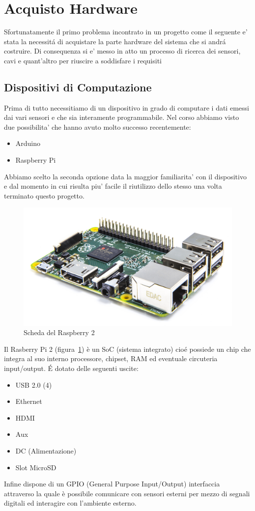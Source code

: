 \section{Acquisto Hardware}

Sfortunatamente il primo problema incontrato in un progetto come il seguente e' stata la necessit\'a di acquistare la parte hardware del sistema che si andr\' a costruire. Di consequenza si e' messo in atto un processo di ricerca dei sensori, cavi e quant'altro per riuscire a soddisfare i requisiti

\subsection{Dispositivi di Computazione}

Prima di tutto necessitiamo di un dispositivo in grado di computare i dati emessi dai vari sensori e che sia interamente programmabile. Nel corso abbiamo visto due possibilita' che hanno avuto molto successo recentemente:

\begin{itemize}
  \item Arduino
  \item Raspberry Pi
\end{itemize}

Abbiamo scelto la seconda opzione data la maggior familiarita' con il dispositivo e dal momento in cui risulta piu' facile il riutilizzo dello stesso una volta terminato questo progetto.

\begin{figure}
\centering
\includegraphics[width=0.7\linewidth]{Figures/Sensors&Rasp/Pi2}
\caption[raspberry]{Scheda del Raspberry 2}
\label{fig:Pi2}
\end{figure}



Il Rasberry Pi 2 (figura~\ref{fig:Pi2}) è un SoC (sistema integrato) cio\'e possiede un chip che integra al suo interno processore, chipset, RAM ed eventuale circuteria input/output. \'E dotato delle seguenti uscite:
\begin{itemize}
\item USB 2.0 (4)
\item Ethernet
\item HDMI
\item Aux
\item DC (Alimentazione)
\item Slot MicroSD
\end{itemize}
Infine dispone di un GPIO (General Purpose Input/Output) interfaccia attraverso la quale è possibile comunicare con sensori esterni per mezzo di segnali digitali ed interagire con l'ambiente esterno.


